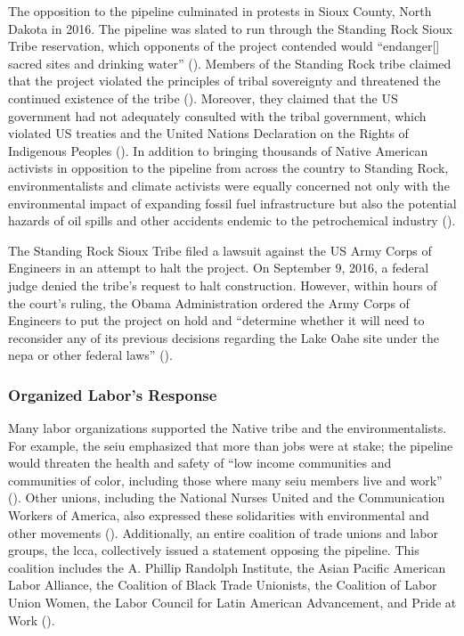 \documentclass[12pt]{article}
\begin{document}
The opposition to the pipeline culminated in protests in Sioux County, North Dakota in 2016. The pipeline was slated to run through the Standing Rock Sioux Tribe reservation, which opponents of the project contended would “endanger[] sacred sites and drinking water” (\cite{sahaFiveThingsKnow2016}). Members of the Standing Rock tribe claimed that the project violated the principles of tribal sovereignty and threatened the continued existence of the tribe (\cite{massieUnderstandDakotaAccess2016}). Moreover, they claimed that the US government had not adequately consulted with the tribal government, which violated US treaties and the United Nations Declaration on the Rights of Indigenous Peoples (\cite{sahaFiveThingsKnow2016}). In addition to bringing thousands of Native American activists in opposition to the pipeline from across the country to Standing Rock, environmentalists and climate activists were equally concerned not only with the environmental impact of expanding fossil fuel infrastructure but also the potential hazards of oil spills and other accidents endemic to the petrochemical industry (\cite{sahaFiveThingsKnow2016}). 

The Standing Rock Sioux Tribe filed a lawsuit against the US Army Corps of Engineers in an attempt to halt the project. On September 9, 2016, a federal judge denied the tribe’s request to halt construction. However, within hours of the court’s ruling, the Obama Administration ordered the Army Corps of Engineers to put the project on hold and “determine whether it will need to reconsider any of its previous decisions regarding the Lake Oahe site under the \acrfull{nepa} or other federal laws” (\cite{officeofpublicaffairsJointStatementDepartment2016}). 

\subsubsection{Organized Labor's Response}

Many labor organizations supported the Native tribe and the environmentalists. For example, the \acrfull{seiu} emphasized that more than jobs were at stake; the pipeline would threaten the health and safety of “low income communities and communities of color, including those where many \acrshort{seiu} members live and work” (\cite{nlfUnionsWeighDakota2016}). Other unions, including the National Nurses United and the Communication Workers of America, also expressed these solidarities with environmental and other movements (\cite{nlfUnionsWeighDakota2016}). Additionally, an entire coalition of trade unions and labor groups, the \acrfull{lcca}, collectively issued a statement opposing the pipeline. This coalition includes the A. Phillip Randolph Institute, the Asian Pacific American Labor Alliance, the Coalition of Black Trade Unionists, the Coalition of Labor Union Women, the Labor Council for Latin American Advancement, and Pride at Work (\cite{apalaAFLCIOConstituencyGroups2016}).
\end{document}
